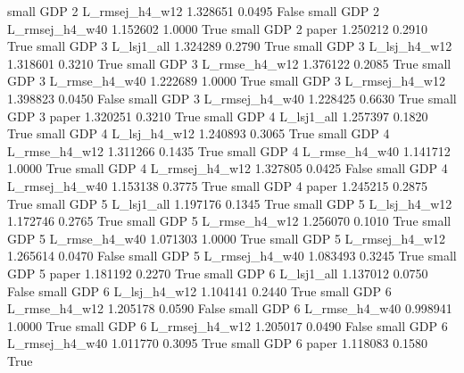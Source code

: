      small      GDP                 2 L_rmsej_h4_w12   1.328651      0.0495   False
     small      GDP                 2 L_rmsej_h4_w40   1.152602      1.0000    True
     small      GDP                 2          paper   1.250212      0.2910    True
     small      GDP                 3     L_lsj1_all   1.324289      0.2790    True
     small      GDP                 3   L_lsj_h4_w12   1.318601      0.3210    True
     small      GDP                 3  L_rmse_h4_w12   1.376122      0.2085    True
     small      GDP                 3  L_rmse_h4_w40   1.222689      1.0000    True
     small      GDP                 3 L_rmsej_h4_w12   1.398823      0.0450   False
     small      GDP                 3 L_rmsej_h4_w40   1.228425      0.6630    True
     small      GDP                 3          paper   1.320251      0.3210    True
     small      GDP                 4     L_lsj1_all   1.257397      0.1820    True
     small      GDP                 4   L_lsj_h4_w12   1.240893      0.3065    True
     small      GDP                 4  L_rmse_h4_w12   1.311266      0.1435    True
     small      GDP                 4  L_rmse_h4_w40   1.141712      1.0000    True
     small      GDP                 4 L_rmsej_h4_w12   1.327805      0.0425   False
     small      GDP                 4 L_rmsej_h4_w40   1.153138      0.3775    True
     small      GDP                 4          paper   1.245215      0.2875    True
     small      GDP                 5     L_lsj1_all   1.197176      0.1345    True
     small      GDP                 5   L_lsj_h4_w12   1.172746      0.2765    True
     small      GDP                 5  L_rmse_h4_w12   1.256070      0.1010    True
     small      GDP                 5  L_rmse_h4_w40   1.071303      1.0000    True
     small      GDP                 5 L_rmsej_h4_w12   1.265614      0.0470   False
     small      GDP                 5 L_rmsej_h4_w40   1.083493      0.3245    True
     small      GDP                 5          paper   1.181192      0.2270    True
     small      GDP                 6     L_lsj1_all   1.137012      0.0750   False
     small      GDP                 6   L_lsj_h4_w12   1.104141      0.2440    True
     small      GDP                 6  L_rmse_h4_w12   1.205178      0.0590   False
     small      GDP                 6  L_rmse_h4_w40   0.998941      1.0000    True
     small      GDP                 6 L_rmsej_h4_w12   1.205017      0.0490   False
     small      GDP                 6 L_rmsej_h4_w40   1.011770      0.3095    True
     small      GDP                 6          paper   1.118083      0.1580    True
